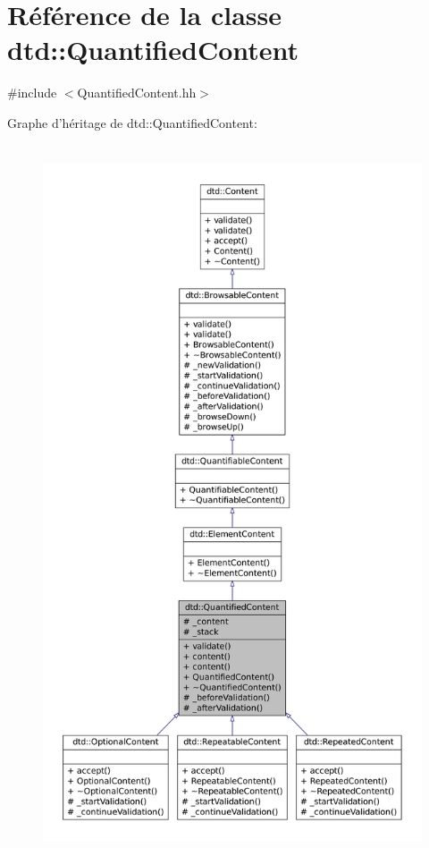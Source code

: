 \hypertarget{classdtd_1_1_quantified_content}{
\section{Référence de la classe dtd::QuantifiedContent}
\label{classdtd_1_1_quantified_content}
}


{\ttfamily \#include $<$QuantifiedContent.hh$>$}



Graphe d'héritage de dtd::QuantifiedContent:\nopagebreak
\begin{figure}[H]
\begin{center}
\leavevmode
\includegraphics[height=600pt]{classdtd_1_1_quantified_content__inherit__graph}
\end{center}
\end{figure}



